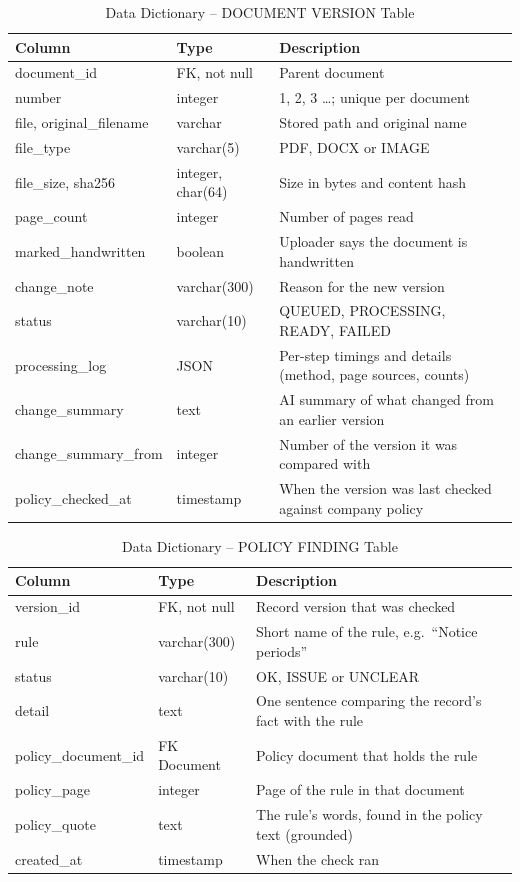 \begin{table}[H]\centering\small
\caption{Data Dictionary -- DOCUMENT VERSION Table}\label{tab:dd-ver}
\begin{tabularx}{\textwidth}{|p{3.2cm}|p{2.6cm}|X|}\hline
\textbf{Column} & \textbf{Type} & \textbf{Description} \\ \hline
document\_id & FK, not null & Parent document \\ \hline
number & integer & 1, 2, 3 \dots; unique per document \\ \hline
file, original\_filename & varchar & Stored path and original name \\ \hline
file\_type & varchar(5) & PDF, DOCX or IMAGE \\ \hline
file\_size, sha256 & integer, char(64) & Size in bytes and content hash \\ \hline
page\_count & integer & Number of pages read \\ \hline
marked\_handwritten & boolean & Uploader says the document is handwritten \\ \hline
change\_note & varchar(300) & Reason for the new version \\ \hline
status & varchar(10) & QUEUED, PROCESSING, READY, FAILED \\ \hline
processing\_log & JSON & Per-step timings and details (method, page sources, counts) \\ \hline
change\_summary & text & AI summary of what changed from an earlier version \\ \hline
change\_summary\_from & integer & Number of the version it was compared with \\ \hline
policy\_checked\_at & timestamp & When the version was last checked against company policy \\ \hline
\end{tabularx}
\end{table}

\begin{table}[H]\centering\small
\caption{Data Dictionary -- POLICY FINDING Table}\label{tab:dd-policy}
\begin{tabularx}{\textwidth}{|p{3.2cm}|p{2.6cm}|X|}\hline
\textbf{Column} & \textbf{Type} & \textbf{Description} \\ \hline
version\_id & FK, not null & Record version that was checked \\ \hline
rule & varchar(300) & Short name of the rule, e.g.\ ``Notice periods'' \\ \hline
status & varchar(10) & OK, ISSUE or UNCLEAR \\ \hline
detail & text & One sentence comparing the record's fact with the rule \\ \hline
policy\_document\_id & FK Document & Policy document that holds the rule \\ \hline
policy\_page & integer & Page of the rule in that document \\ \hline
policy\_quote & text & The rule's words, found in the policy text (grounded) \\ \hline
created\_at & timestamp & When the check ran \\ \hline
\end{tabularx}
\end{table}

